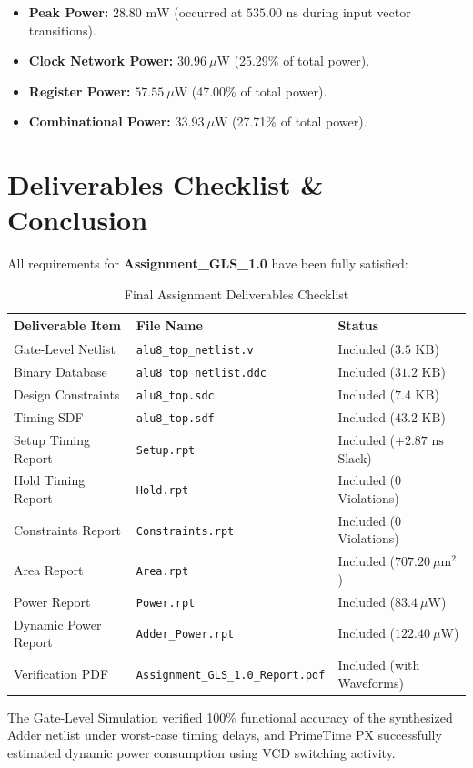 \documentclass[12pt,a4paper]{article}
\begin{document}
\begin{itemize}
  \item \textbf{Peak Power:} \textbf{$28.80\text{ mW}$} (occurred at $535.00\text{ ns}$ during input vector transitions).
  \item \textbf{Clock Network Power:} $30.96\ \mu\text{W}$ (25.29\% of total power).
  \item \textbf{Register Power:} $57.55\ \mu\text{W}$ (47.00\% of total power).
  \item \textbf{Combinational Power:} $33.93\ \mu\text{W}$ (27.71\% of total power).
\end{itemize}

\section{Deliverables Checklist \& Conclusion}

All requirements for \textbf{Assignment\_GLS\_1.0} have been fully satisfied:

\begin{table}[H]
\centering
\begin{tabular}{lll}
\toprule
\textbf{Deliverable Item} & \textbf{File Name} & \textbf{Status} \\
\midrule
Gate-Level Netlist   & \texttt{alu8\_top\_netlist.v} & Included ($3.5\text{ KB}$) \\
Binary Database      & \texttt{alu8\_top\_netlist.ddc} & Included ($31.2\text{ KB}$) \\
Design Constraints   & \texttt{alu8\_top.sdc} & Included ($7.4\text{ KB}$) \\
Timing SDF           & \texttt{alu8\_top.sdf} & Included ($43.2\text{ KB}$) \\
Setup Timing Report  & \texttt{Setup.rpt} & Included ($+2.87\text{ ns}$ Slack) \\
Hold Timing Report   & \texttt{Hold.rpt} & Included (0 Violations) \\
Constraints Report   & \texttt{Constraints.rpt} & Included (0 Violations) \\
Area Report          & \texttt{Area.rpt} & Included ($707.20\ \mu\text{m}^2$) \\
Power Report         & \texttt{Power.rpt} & Included ($83.4\ \mu\text{W}$) \\
Dynamic Power Report & \texttt{Adder\_Power.rpt} & Included ($122.40\ \mu\text{W}$) \\
Verification PDF     & \texttt{Assignment\_GLS\_1.0\_Report.pdf} & Included (with Waveforms) \\
\bottomrule
\end{tabular}
\caption{Final Assignment Deliverables Checklist}
\end{table}

The Gate-Level Simulation verified 100\% functional accuracy of the synthesized Adder netlist under worst-case timing delays, and PrimeTime PX successfully estimated dynamic power consumption using VCD switching activity.
\end{document}
